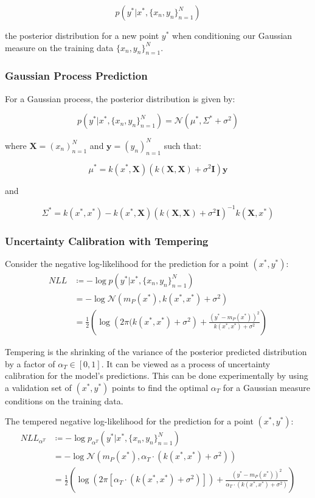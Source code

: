 \documentclass[twoside,11pt]{article}
\begin{document}
\[p(y^*|x^*, \{x_n, y_n\}_{n=1}^N)\]

the posterior distribution for a new point $y^*$ when conditioning our Gaussian measure on the training data $\{x_n, y_n\}_{n=1}^N$.

\subsubsection{Gaussian Process Prediction}

For a Gaussian process, the posterior distribution is given by:

\[p(y^*|x^*, \{x_n, y_n\}_{n=1}^N) = \mathcal{N}(\mu^*, \Sigma^* + \sigma^2)\]

where $\mathbf{X} = (x_n)_{n=1}^{N}$ and $\mathbf{y} = (y_n)_{n=1}^{N}$ such that:

\[\mu^* = k(x^*, \mathbf{X}) \left(k(\mathbf{X}, \mathbf{X}) + \sigma^2\mathbf{I}\right) \mathbf{y}\]

and

\[\Sigma^* = k(x^*, x^*) - k(x^*, \mathbf{X})\left(k(\mathbf{X}, \mathbf{X}) + \sigma^2\mathbf{I}\right)^{-1} k(\mathbf{X}, x^*)\]


\subsubsection{Uncertainty Calibration with Tempering}

Consider the negative log-likelihood for the prediction for a point $(x^*, y^*)$:
\begin{align*}
    NLL &\coloneqq - \log p(y^*|x^*, \{x_n, y_n\}_{n=1}^N)\\
    &= - \log \mathcal{N} \left( m_P(x^*), k(x^*, x^*) + \sigma^2\right)\\
    &= \frac{1}{2} \left( \log\left(2\pi(k(x^*, x^*)+\sigma^2\right) + \frac{(y^*-m_P(x^*))^2}{k(x^*, x^*) + \sigma^2}\right)
    \end{align*}

Tempering is the shrinking of the variance of the posterior predicted distribution by a factor of $\alpha_T \in [0, 1]$.
It can be viewed as a process of uncertainty calibration for the model's predictions.
This can be done experimentally by using a validation set of $(x^*, y^*)$ points to find the optimal $\alpha_T$ for a Gaussian measure conditions on the training data.

The tempered negative log-likelihood for the prediction for a point $(x^*, y^*)$:
\begin{align*}
    NLL_{\alpha^{T}} &\coloneqq - \log p_{\alpha^T}(y^*|x^*, \{x_n, y_n\}_{n=1}^N)\\
    &= - \log \mathcal{N} \left( m_P(x^*), \alpha_T \cdot (k(x^*, x^*) + \sigma^2)\right)\\
    &= \frac{1}{2} \left( \log\left(2\pi \left[ \alpha_T \cdot (k(x^*, x^*)+\sigma^2)\right]\right) + \frac{(y^*-m_P(x^*))^2}{\alpha_T\cdot (k(x^*, x^*) + \sigma^2)}\right)
    \end{align*}
\end{document}
